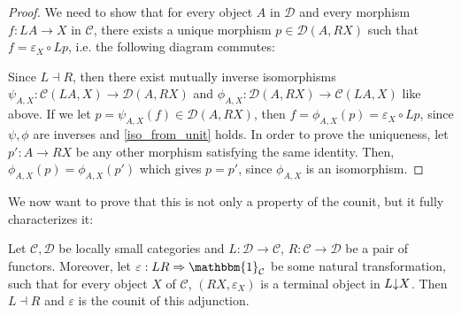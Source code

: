 \begin{proof} We need to show that for every object $A$ in $\mathcal{D}$ and every morphism $f:LA\to X$ in $\mathcal{C}$, there exists a unique morphism $p\in\mathcal{D}(A,RX)$ such that $f=\varepsilon_X\circ Lp$, i.e. the following diagram commutes:
\begin{center}
\end{center}
Since $L\dashv R$, then there exist mutually inverse isomorphisms $\psi_{A,X}:\mathcal{C}(LA,X)\to\mathcal{D}(A,RX)$ and $\phi_{A,X}:\mathcal{D}(A,RX)\to\mathcal{C}(LA,X)$ like above. If we let $p=\psi_{A,X}(f)\in\mathcal{D}(A,RX)$, then $f=\phi_{A,X}(p)=\varepsilon_X\circ Lp$, since $\psi,\phi$ are inverses and \eqref{iso_from_unit} holds. In order to prove the uniqueness, let $p':A\to RX$ be any other morphism satisfying the same identity. Then, $\phi_{A,X}(p)=\phi_{A,X}(p')$ which gives $p=p'$, since $\phi_{A,X}$ is an isomorphism.
\end{proof}
We now want to prove that this is not only a property of the counit, but it fully characterizes it:
\begin{theorem}[co-2.3.6]\label{th:alternative_def} Let $\mathcal{C},\mathcal{D}$ be locally small categories and $L:\mathcal{D}\to\mathcal{C}$, $R:\mathcal{C}\to\mathcal{D}$ be a pair of functors. Moreover, let $\varepsilon:LR\Rightarrow\mathbbm{1}_{\mathcal{C}}$ be some natural transformation, such that for every object $X$ of $\mathcal{C}$, $(RX,\varepsilon_X)$ is a terminal object in $L\mkern-5mu\downarrow\mkern-5mu X$. Then $L\dashv R$ and $\varepsilon$ is the counit of this adjunction.
\end{theorem}
